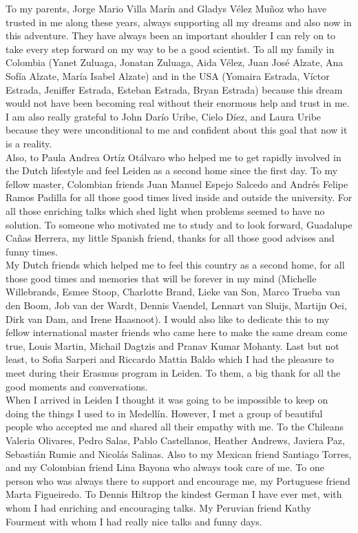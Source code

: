 To my parents, Jorge Mario Villa Mar\'in and Gladys V\'elez Mu\~noz who have trusted in me along these years, always supporting all my dreams and also now in this adventure. They have always been an important shoulder I can rely on to take every step forward on my way to be a good scientist. To all my family in Colombia (Yanet Zuluaga, Jonatan Zuluaga, Aida V\'elez, Juan Jos\'e Alzate, Ana Sof\'ia Alzate, Mar\'ia Isabel Alzate) and in the USA (Yomaira Estrada, V\'ictor Estrada, Jeniffer Estrada, Esteban Estrada, Bryan Estrada)  because this dream would not have been becoming real without their enormous help and trust in me. I am also really grateful to John Dar\'io Uribe, Cielo D\'iez, and Laura Uribe because they were unconditional to me and confident about this goal that now it is a reality.\\

Also, to Paula Andrea Ort\'iz Ot\'alvaro who helped me to get rapidly involved in the Dutch lifestyle and feel Leiden as a second home since the first day. To my fellow master, Colombian friends Juan Manuel Espejo Salcedo and Andr\'es Felipe Ramos Padilla for all those good times lived inside and outside the university. For all those enriching talks which shed light when problems seemed to have no solution. To someone who motivated me to study and to look forward, Guadalupe Ca\~nas Herrera, my little Spanish friend, thanks for all those good advises and funny times.\\

My Dutch friends which helped me to feel this country as a second home, for all those good times and memories that will be forever in my mind (Michelle Willebrands, Esmee Stoop, Charlotte Brand, Lieke van Son, Marco Trueba van den Boom, Job van der Wardt, Dennis Vaendel, Lennart van Sluijs, Martijn Oei, Dirk van Dam, and Irene Haasnoot). I would also like to dedicate this to my fellow international master friends who came here to make the same dream come true, Louis Martin, Michail Dagtzis and Pranav Kumar Mohanty. Last but not least, to Sofia Sarperi and Riccardo Mattia Baldo which I had the pleasure to meet during their Erasmus program in Leiden. To them, a big thank for all the good moments and conversations. \\

When I arrived in Leiden I thought it was going to be impossible to keep on doing the things I used to in Medell\'in. However, I met a group of beautiful people who accepted me and shared all their empathy with me. To the Chileans Valeria Olivares, Pedro Salas, Pablo Castellanos, Heather Andrews, Javiera Paz, Sebasti\'an Rumie and Nicol\'as Salinas. Also to my Mexican friend Santiago Torres, and my Colombian friend Lina Bayona who always took care of me. To one person who was always there to support and encourage me, my Portuguese friend Marta Figueiredo. To Dennis Hiltrop the kindest German I have ever met, with whom I had enriching and encouraging talks. My Peruvian friend Kathy Fourment with whom I had really nice talks and funny days.\\

